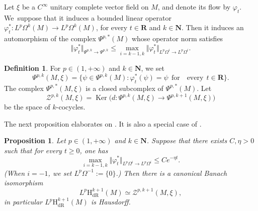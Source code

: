 \documentclass[JEP,XML,SOM,Unicode,published]{cedram}
\newcommand{\dR}{\mathrm{dR}}
\newcommand{\rH}{\mathrm{H}}
\newcommand{\NN}{\mathbf{N}}
\newcommand{\RR}{\mathbf{R}}
\theoremstyle{plain}
\newtheorem{proposition}[equation]{Proposition}
\theoremstyle{remark}
\theoremstyle{definition}
\newtheorem{definition}[equation]{Definition}
\DeclareMathOperator{\Ker}{Ker}
\begin{document}
Let $\xi$ be a $C^\infty$ unitary complete vector field on $M$, and denote its flow by $\varphi_t$.
We~suppose that it induces a bounded linear operator
$\varphi_t^*: L^p \Omega^k (M) \to L^p \Omega^k(M)$, for every $t \in \RR$ and $k \in \NN$.
Then it induces an automorphism of the complex $\Psi^{p,*}(M)$
whose operator norm satisfies
\[\Vert \varphi_t^* \Vert_{\Psi^{p,k} \to \Psi^{p,k}} \leqslant \max_{i = k-1, k} \Vert \varphi_t^* \Vert_{L^p \Omega^{i} \to L^p \Omega^{i}}.\]

\begin{definition} For $p \in (1, +\infty)$ and $k \in \NN$, we set
\[\Psi^{p,k} (M, \xi)= \{\psi \in \Psi^{p,k} (M): \varphi_t^* (\psi) = \psi~~ \text{for~~ every}~~ t \in \RR\}.\]
The complex $\Psi^{p,*} (M, \xi)$ is a closed subcomplex of $\Psi^{p,*}(M)$. Let
\[\mathcal Z^{p,k} (M, \xi) = \Ker \bigl(d: \Psi^{p,k} (M, \xi) \to \Psi^{p,k+1} (M, \xi)\bigr)\]
be the space of $k$-cocycles.
\end{definition}

The next proposition elaborates on \cite[Prop.\,10]{P1}.
It is also a special case of \cite[Cor.\,12]{Pa09}.

\begin{proposition}\label{current-proposition} Let $p \in (1, +\infty)$ and $k \in \NN$.
Suppose that there exists $C, \eta >0$ such that for every $t \geqslant 0$,
one has
\[\max_{i = k-1, k} \Vert \varphi_t^* \Vert_{L^p \Omega^{i} \to L^p \Omega^{i}} \leqslant C e^{-\eta t}.\]
(When $i=-1$, we set $L^p \Omega^{-1}:= \{0\}$.)
Then there is a canonical Banach isomorphism
\[L^p \rH_\dR^{k+1} (M) \simeq \mathcal Z^{p,k+1} (M, \xi),\]
in particular $L^p \rH_\dR^{k+1} (M)$ is Hausdorff.
\end{proposition}
\end{document}

